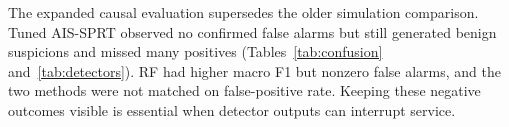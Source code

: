The expanded causal evaluation supersedes the older simulation comparison.
Tuned AIS-SPRT observed no confirmed false alarms but still generated
benign suspicions and missed many positives
(Tables~\ref{tab:confusion} and~\ref{tab:detectors}). RF had higher
macro F1 but nonzero false alarms, and the two methods were not matched
on false-positive rate. Keeping these negative outcomes visible is
essential when detector outputs can interrupt service.
